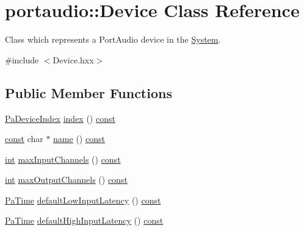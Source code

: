 \hypertarget{classportaudio_1_1_device}{}\section{portaudio\+:\+:Device Class Reference}
\label{classportaudio_1_1_device}


Class which represents a Port\+Audio device in the \hyperlink{classportaudio_1_1_system}{System}.  




{\ttfamily \#include $<$Device.\+hxx$>$}

\subsection*{Public Member Functions}
\begin{DoxyCompactItemize}
\item 
\hyperlink{portaudio_8h_ad79317e65bde63d76c4b8e711ac5a361}{Pa\+Device\+Index} \hyperlink{classportaudio_1_1_device_a48ba9945cdcafd30d80c20c94c0720db}{index} () \hyperlink{getopt1_8c_a2c212835823e3c54a8ab6d95c652660e}{const} 
\item 
\hyperlink{getopt1_8c_a2c212835823e3c54a8ab6d95c652660e}{const} char $\ast$ \hyperlink{classportaudio_1_1_device_a94f11ed3010a27d047616f30d88dc414}{name} () \hyperlink{getopt1_8c_a2c212835823e3c54a8ab6d95c652660e}{const} 
\item 
\hyperlink{xmltok_8h_a5a0d4a5641ce434f1d23533f2b2e6653}{int} \hyperlink{classportaudio_1_1_device_aacbf4b051102405a91a7cbda56b9f6b0}{max\+Input\+Channels} () \hyperlink{getopt1_8c_a2c212835823e3c54a8ab6d95c652660e}{const} 
\item 
\hyperlink{xmltok_8h_a5a0d4a5641ce434f1d23533f2b2e6653}{int} \hyperlink{classportaudio_1_1_device_a568e49c04d3adb72f4115a6c2ea3dd4e}{max\+Output\+Channels} () \hyperlink{getopt1_8c_a2c212835823e3c54a8ab6d95c652660e}{const} 
\item 
\hyperlink{portaudio_8h_af17a7e6d0471a23071acf8dbd7bbe4bd}{Pa\+Time} \hyperlink{classportaudio_1_1_device_ad6f9871cf1fa40aaae5c0722e1ae6dc6}{default\+Low\+Input\+Latency} () \hyperlink{getopt1_8c_a2c212835823e3c54a8ab6d95c652660e}{const} 
\item 
\hyperlink{portaudio_8h_af17a7e6d0471a23071acf8dbd7bbe4bd}{Pa\+Time} \hyperlink{classportaudio_1_1_device_a187cca4b5454229af63ff158609260fc}{default\+High\+Input\+Latency} () \hyperlink{getopt1_8c_a2c212835823e3c54a8ab6d95c652660e}{const} 
\item 

\end{DoxyCompactItemize}
